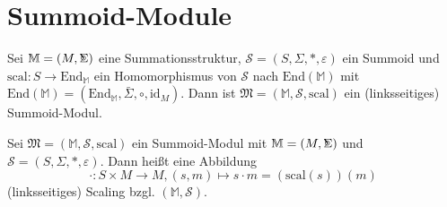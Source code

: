 \documentclass{article}
\DeclareMathOperator*{\Sigmacirc}{%
  \ThisStyle{\mathop{\ensurestackMath{\stackinset{c}{-0.75\LMpt}{c}{}{%
  \rotatebox[origin=lb]{-90}{$\circ$}}{\SavedStyle\Sigma}}}}}
\begin{document}
\newpage
\section{Summoid-Module}

\begin{definition}
  Sei $\mathbb{M} = (M, \Sigmacirc)$ eine Summationsstruktur, $\mathcal{S} = (S, \Sigma, \ast, \varepsilon)$ ein Summoid
  und $\text{scal} \colon S \to \text{End}_\mathbb{M}$ ein Homomorphismus von $\mathcal{S}$ nach $\text{End}(\mathbb{M})$
  mit $\text{End}(\mathbb{M}) = (\text{End}_\mathbb{M}, \bar\Sigma, \circ, \text{id}_M)$.
  Dann ist $\mathfrak{M} = (\mathbb{M}, \mathcal{S}, \text{scal})$ ein (linksseitiges) Summoid-Modul.
\end{definition}

\begin{definition}
  Sei $\mathfrak{M} = (\mathbb{M}, \mathcal{S}, \text{scal})$ ein Summoid-Modul mit
  $\mathbb{M} = (M, \Sigmacirc)$ und $\mathcal{S} = (S, \Sigma, \ast, \varepsilon)$.
  Dann heißt eine Abbildung 
  \begin{equation*}
    \cdot \colon S \times M \to M, (s, m) \mapsto s \cdot m = (\text{scal}(s))(m)
  \end{equation*}
  (linksseitiges) Scaling bzgl. $(\mathbb{M}, \mathcal{S})$.
\end{definition}
\end{document}
